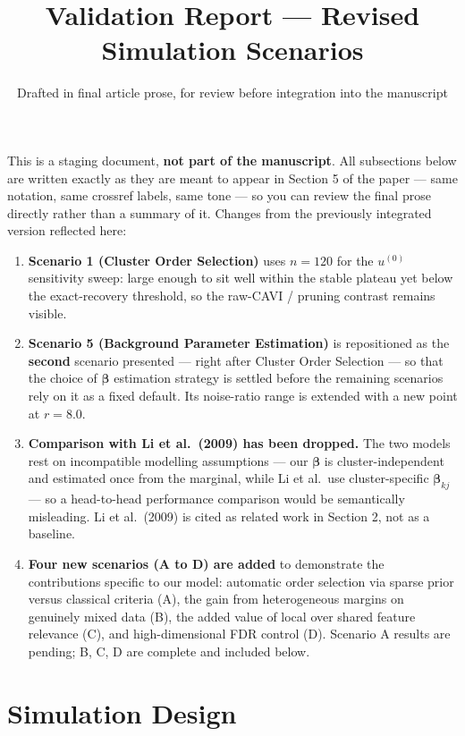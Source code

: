 \documentclass[
  letterpaper,
  DIV=11,
  numbers=noendperiod]{scrartcl}
\title{Validation Report --- Revised Simulation Scenarios}
\subtitle{Drafted in final article prose, for review before integration
into the manuscript}
\author{}
\date{}
\providecommand{\tightlist}{%
  \setlength{\itemsep}{0pt}\setlength{\parskip}{0pt}}
\renewcommand*\contentsname{Table of contents}
\newcommand\contentsname{Table of contents}
\begin{document}
\maketitle

\renewcommand*\contentsname{Table of contents}
{
\setcounter{tocdepth}{3}
\tableofcontents
}

This is a staging document, \textbf{not part of the manuscript}. All
subsections below are written exactly as they are meant to appear in
Section 5 of the paper --- same notation, same crossref labels, same
tone --- so you can review the final prose directly rather than a
summary of it. Changes from the previously integrated version reflected
here:

\begin{enumerate}
\def\labelenumi{\arabic{enumi}.}
\tightlist
\item
  \textbf{Scenario 1 (Cluster Order Selection)} uses \(n = 120\) for the
  \(u^{(0)}\) sensitivity sweep: large enough to sit well within the
  stable plateau yet below the exact-recovery threshold, so the raw-CAVI
  / pruning contrast remains visible.
\item
  \textbf{Scenario 5 (Background Parameter Estimation)} is repositioned
  as the \textbf{second} scenario presented --- right after Cluster
  Order Selection --- so that the choice of \(\bm{\beta}\) estimation
  strategy is settled before the remaining scenarios rely on it as a
  fixed default. Its noise-ratio range is extended with a new point at
  \(r = 8.0\).
\item
  \textbf{Comparison with Li et al.~(2009) has been dropped.} The two
  models rest on incompatible modelling assumptions --- our
  \(\bm{\beta}\) is cluster-independent and estimated once from the
  marginal, while Li et al.~use cluster-specific \(\bm{\beta}_{kj}\) ---
  so a head-to-head performance comparison would be semantically
  misleading. Li et al.~(2009) is cited as related work in Section 2,
  not as a baseline.
\item
  \textbf{Four new scenarios (A to D) are added} to demonstrate the
  contributions specific to our model: automatic order selection via
  sparse prior versus classical criteria (A), the gain from
  heterogeneous margins on genuinely mixed data (B), the added value of
  local over shared feature relevance (C), and high-dimensional FDR
  control (D). Scenario A results are pending; B, C, D are complete and
  included below.
\end{enumerate}

\section{Simulation Design}\label{sec-sim-design}
\end{document}
